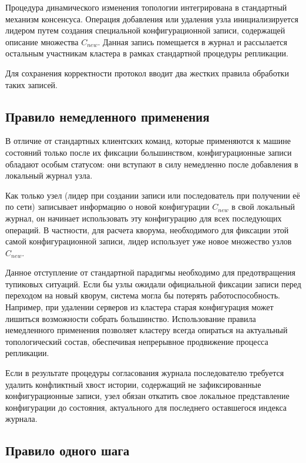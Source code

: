 Процедура динамического изменения топологии интегрирована в стандартный механизм консенсуса. Операция добавления или удаления узла инициализируется лидером путем создания специальной конфигурационной записи, содержащей описание множества $C_{new}$. Данная запись помещается в журнал и рассылается остальным участникам кластера в рамках стандартной процедуры репликации.

Для сохранения корректности протокол вводит два жестких правила обработки таких записей.

\subsection{Правило немедленного применения}

В отличие от стандартных клиентских команд, которые применяются к машине состояний только после их фиксации большинством, конфигурационные записи обладают особым статусом: они вступают в силу немедленно после добавления в локальный журнал узла.

Как только узел (лидер при создании записи или последователь при получении её по сети) записывает информацию о новой конфигурации $C_{new}$ в свой локальный журнал, он начинает использовать эту конфигурацию для всех последующих операций. В частности, для расчета кворума, необходимого для фиксации этой самой конфигурационной записи, лидер использует уже новое множество узлов $C_{new}$.

Данное отступление от стандартной парадигмы необходимо для предотвращения тупиковых ситуаций. Если бы узлы ожидали официальной фиксации записи перед переходом на новый кворум, система могла бы потерять работоспособность. Например, при удалении серверов из кластера старая конфигурация может лишиться возможности собрать большинство. Использование правила немедленного применения позволяет кластеру всегда опираться на актуальный топологический состав, обеспечивая непрерывное продвижение процесса репликации.

Если в результате процедуры согласования журнала последователю требуется удалить конфликтный хвост истории, содержащий не зафиксированные конфигурационные записи, узел обязан откатить свое локальное представление конфигурации до состояния, актуального для последнего оставшегося индекса журнала.

\subsection{Правило одного шага}

